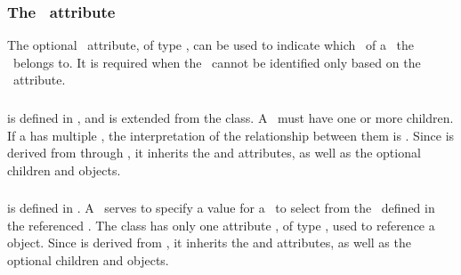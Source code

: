 \subsubsection{The \componentAtt\ attribute}
\label{def:SpeciesFeature:component}

The optional \componentAtt\ attribute, of type \SIdRefPT, can be used to indicate which \componentWR\ of a \species\ the \speciesFeature\ belongs to. It is required when the \component\ cannot be identified only based on the\\
\speciesFeatureTypeAtt\ attribute.


\subsubsection{}
\label{def:ListOfSpeciesFeatureValues}

 is defined in , and is extended from the  class. A \listOfSpeciesFeatureValues\ must have one or more \SpeciesFeatureValue children. If a  has multiple \speciesFeatureValues, the interpretation of the relationship between them is . Since  is derived from  through , it inherits the  and  attributes, as well as the optional children  and  objects.

\subsubsection{}
\label{def:SpeciesFeatureValue}

 is defined in . A \speciesFeatureValue\ serves to specify a value for a \speciesFeature\ to select from the \listOfPossibleSpeciesFeatureValues\ defined in the referenced \speciesFeatureType. The  class has only one attribute , of type \SIdRefPT, used to reference a \PossibleSpeciesFeatureValue object. Since  is derived from , it inherits the  and  attributes, as well as the optional children  and  objects. 


